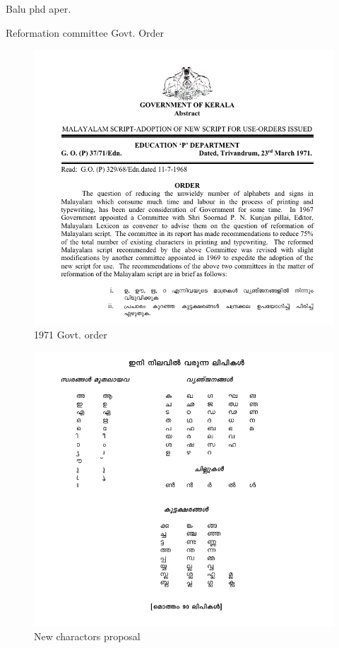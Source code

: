 \documentclass[10pt]{article}
\begin{document}
Balu phd aper.

Reformation committee
Govt. Order

\begin{figure}[h]
  \centering
   \includegraphics[width=1.0\textwidth]{images/1971-gov-script-reformation-order.png}
     \caption{1971 Govt. order}
\end{figure}

\begin{figure}
  \centering
   \includegraphics[width=1.0\textwidth]{images/1971-new-lipi.png}
  \caption{New charactors proposal}
\end{figure}
\end{document}
